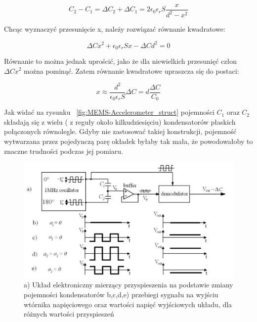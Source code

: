 \begin{equation}
	C_2 - C_1 = \Delta{C_2} + \Delta{C_1} = 2\epsilon_0\epsilon_rS\frac{x}{d^2 - x^2}
\end{equation}

Chcąc wyznaczyć przesunięcie x, należy rozwiązać równanie kwadratowe:

\begin{equation}
	\Delta{C}x^2 + \epsilon_0\epsilon_rSx - \Delta{C}d^2 = 0
\end{equation}

Równanie to można jednak uprościć, jako że dla niewielkich przesunięć człon $\Delta{C}x^2$ można pominąć. Zatem równanie kwadratowe upraszcza się do postaci:

\begin{equation}
	x \approx \frac{d^2}{\epsilon_0\epsilon_rS}\Delta{C} = d\frac{\Delta{C}}{C_0}
	\label{x_to_c}
\end{equation}

Jak widać na rysunku ~\ref{fig:MEMS-Accelerometer_struct} pojemności $C_1$ oraz $C_2$ składają się z wielu ( z reguły około kilkudziesięciu)  kondensatorów płaskich połączonych równolegle. Gdyby nie zastosować takiej konstrukcji, pojemność wytwarzana przez pojedynczą parę okładek byłaby tak mała, że powodowałoby to znaczne trudności podczas jej pomiaru. 

\begin{figure}[H]
	\centering
	\includegraphics[scale=0.4]{Pictures/MEMS_accel_demod.png}
		\caption[Układ elektroniczny do pomiaru różnicy pojemności kondensatorów]{a) Układ elektroniczny mierzący przyspieszenia na podstawie zmiany pojemności kondensatorów b,c,d,e) przebiegi sygnału na wyjściu wtórnika napięciowego oraz wartości napięć wyjściowych układu, dla różnych wartości przyspieszeń~\cite{mems12, mems13}}
	\label{fig:MEMS_accel_demod}
\end{figure}


